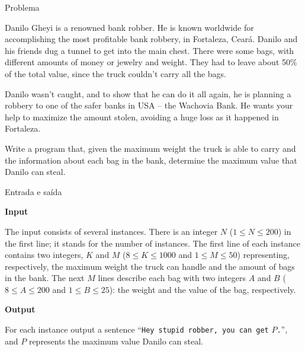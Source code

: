 
\begin{frame}[fragile]{Problema}

Danilo Gheyi is a renowned bank robber. He is known worldwide for accomplishing the most 
profitable bank robbery, in Fortaleza, Ceará. Danilo and his friends dug a tunnel to get into 
the main chest. There were some bags, with different amounts of money or jewelry and weight. 
They had to leave about 50\% of the total value, since the truck couldn't carry all the bags.

Danilo wasn't caught, and to show that he can do it all again, he is planning a robbery to one 
of the safer banks in USA -- the Wachovia Bank. He wants your help to maximize the amount 
stolen, avoiding a huge loss as it happened in Fortaleza.

Write a program that, given the maximum weight the truck is able to carry and the information 
about each bag in the bank, determine the maximum value that Danilo can steal.

\end{frame}

\begin{frame}[fragile]{Entrada e saída}

\textbf{Input}

The input consists of several instances. There is an integer $N$ ($1\leq N\leq 200$) in the 
first line; it stands for the number of instances. The first line of each instance contains two 
integers, $K$ and $M$ ($8\leq K\leq 1000$ and $1\leq M\leq 50$) representing, respectively, the 
maximum weight the truck can handle and the amount of bags in the bank. The next $M$ lines 
describe each bag with two integers $A$ and $B$ ($8\leq A\leq 200$ and $1\leq B\leq 25$): the 
weight and the value of the bag, respectively.

\vspace{0.2in}

\textbf{Output}

For each instance output a sentence ``\texttt{Hey stupid robber, you can get} $P$\texttt{.}'',
and $P$ represents the maximum value Danilo can steal.

\end{frame}

